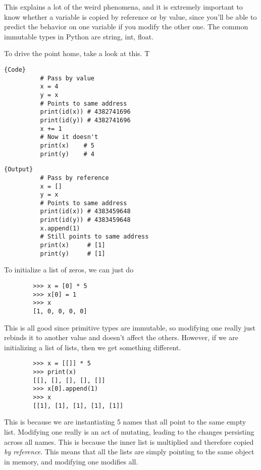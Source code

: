 \documentclass{article}
\begin{document}
    This explains a lot of the weird phenomena, and it is extremely important to know whether a variable is copied by reference or by value, since you'll be able to predict the behavior on one variable if you modify the other one. The common immutable types in Python are string, int, float.


    \begin{example}
      To drive the point home, take a look at this. T

      \noindent\begin{minipage}{.5\textwidth}
        \begin{lstlisting}[]{Code}
          # Pass by value
          x = 4 
          y = x
          # Points to same address
          print(id(x)) # 4382741696 
          print(id(y)) # 4382741696 
          x += 1 
          # Now it doesn't
          print(x)    # 5
          print(y)    # 4
        \end{lstlisting}
        \end{minipage}
        \hfill
        \begin{minipage}{.49\textwidth}
        \begin{lstlisting}[]{Output}
          # Pass by reference
          x = [] 
          y = x
          # Points to same address 
          print(id(x)) # 4383459648
          print(id(y)) # 4383459648
          x.append(1) 
          # Still points to same address
          print(x)     # [1]
          print(y)     # [1]
        \end{lstlisting}
      \end{minipage}
    \end{example}

    \begin{example}
      To initialize a list of zeros, we can just do 
      \begin{lstlisting}
        >>> x = [0] * 5
        >>> x[0] = 1
        >>> x
        [1, 0, 0, 0, 0] 
      \end{lstlisting}
      This is all good since primitive types are immutable, so modifying one really just rebinds it to another value and doesn't affect the others. However, if we are initializing a list of lists, then we get something different. 
      \begin{lstlisting}
        >>> x = [[]] * 5
        >>> print(x)
        [[], [], [], [], []]
        >>> x[0].append(1)
        >>> x
        [[1], [1], [1], [1], [1]] 
      \end{lstlisting}
      This is because we are instantiating 5 names that all point to the same empty list. Modifying one really is an act of mutating, leading to the changes persisting across all names. This is because the inner list is multiplied and therefore copied \textit{by reference}. This means that all the lists are simply pointing to the same object in memory, and modifying one modifies all.  
    \end{example}
\end{document}
